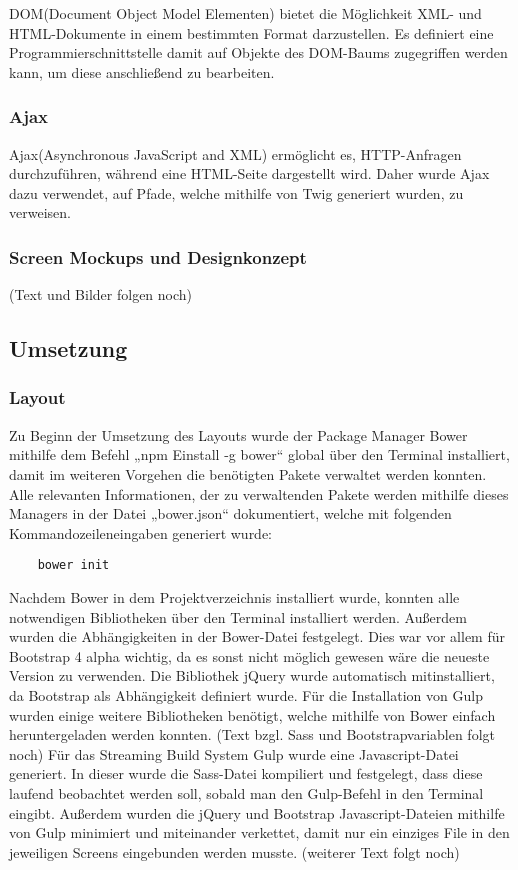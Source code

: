 	DOM(Document Object Model Elementen) bietet die Möglichkeit XML- und HTML-Dokumente in einem bestimmten Format darzustellen. Es definiert eine Programmierschnittstelle damit auf Objekte des DOM-Baums zugegriffen werden kann, um diese anschließend zu bearbeiten.

    \subsubsection{Ajax}

	Ajax(Asynchronous JavaScript and XML) ermöglicht es, HTTP-Anfragen durchzuführen, während eine HTML-Seite dargestellt wird. Daher wurde Ajax dazu verwendet, auf Pfade, welche mithilfe von Twig generiert wurden, zu verweisen.

    \subsubsection{Screen Mockups und Designkonzept}

	(Text und Bilder folgen noch)

  \subsection{Umsetzung}

    \subsubsection{Layout}

	Zu Beginn der Umsetzung des Layouts wurde der Package Manager Bower mithilfe dem Befehl „npm Einstall -g bower“ global über den Terminal installiert, damit im weiteren Vorgehen die benötigten Pakete verwaltet werden konnten. Alle relevanten Informationen, der zu verwaltenden Pakete werden mithilfe dieses Managers in der Datei „bower.json“ dokumentiert, welche mit folgenden Kommandozeileneingaben generiert wurde:
	\lstset{language = bash}
  	\begin{lstlisting}
  	bower init
  	\end{lstlisting}
	Nachdem Bower in dem Projektverzeichnis installiert wurde, konnten alle notwendigen Bibliotheken über den Terminal installiert werden. Außerdem wurden die Abhängigkeiten in der Bower-Datei festgelegt. Dies war vor allem für Bootstrap 4 alpha wichtig, da es sonst nicht möglich gewesen wäre die neueste Version zu verwenden. Die Bibliothek jQuery wurde automatisch mitinstalliert, da Bootstrap als Abhängigkeit definiert wurde. Für die Installation von Gulp wurden einige weitere Bibliotheken benötigt, welche mithilfe von Bower einfach heruntergeladen werden konnten.
	(Text bzgl. Sass und Bootstrapvariablen folgt noch)
	Für das Streaming Build System Gulp wurde eine Javascript-Datei generiert. In dieser wurde die Sass-Datei kompiliert und festgelegt, dass diese laufend beobachtet werden soll, sobald man den Gulp-Befehl in den Terminal eingibt. Außerdem wurden die jQuery und Bootstrap Javascript-Dateien mithilfe von Gulp minimiert und miteinander verkettet, damit nur ein einziges File in den jeweiligen Screens eingebunden werden musste.
	(weiterer Text folgt noch)

